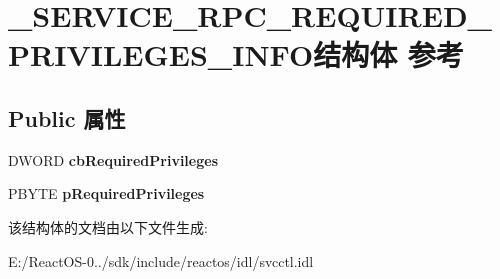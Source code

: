 \hypertarget{struct___s_e_r_v_i_c_e___r_p_c___r_e_q_u_i_r_e_d___p_r_i_v_i_l_e_g_e_s___i_n_f_o}{}\section{\+\_\+\+S\+E\+R\+V\+I\+C\+E\+\_\+\+R\+P\+C\+\_\+\+R\+E\+Q\+U\+I\+R\+E\+D\+\_\+\+P\+R\+I\+V\+I\+L\+E\+G\+E\+S\+\_\+\+I\+N\+F\+O结构体 参考}
\label{struct___s_e_r_v_i_c_e___r_p_c___r_e_q_u_i_r_e_d___p_r_i_v_i_l_e_g_e_s___i_n_f_o}
\subsection*{Public 属性}
\begin{DoxyCompactItemize}
\item 
\mbox{\label{struct___s_e_r_v_i_c_e___r_p_c___r_e_q_u_i_r_e_d___p_r_i_v_i_l_e_g_e_s___i_n_f_o_a0c7e58d1398a89d6425eb5b29df07c86}} 
D\+W\+O\+RD {\bfseries cb\+Required\+Privileges}
\item 
\mbox{\label{struct___s_e_r_v_i_c_e___r_p_c___r_e_q_u_i_r_e_d___p_r_i_v_i_l_e_g_e_s___i_n_f_o_a4565ddb4ee093a3e8800b59978b09b28}} 
P\+B\+Y\+TE {\bfseries p\+Required\+Privileges}
\end{DoxyCompactItemize}


该结构体的文档由以下文件生成\+:\begin{DoxyCompactItemize}
\item 
E\+:/\+React\+O\+S-\/0../sdk/include/reactos/idl/svcctl.\+idl\end{DoxyCompactItemize}
